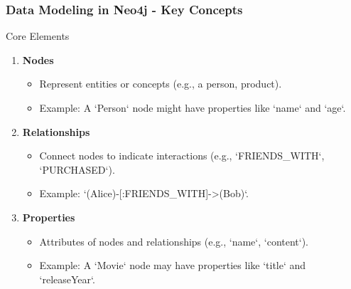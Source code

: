 \documentclass[aspectratio=169]{beamer}
\begin{document}
\begin{frame}[fragile]
    \frametitle{Data Modeling in Neo4j - Key Concepts}
    \begin{block}{Core Elements}
        \begin{enumerate}
            \item \textbf{Nodes}
            \begin{itemize}
                \item Represent entities or concepts (e.g., a person, product).
                \item Example: A `Person` node might have properties like `name` and `age`.
            \end{itemize}
        
            \item \textbf{Relationships}
            \begin{itemize}
                \item Connect nodes to indicate interactions (e.g., `FRIENDS_WITH`, `PURCHASED`).
                \item Example: `(Alice)-[:FRIENDS_WITH]->(Bob)`.
            \end{itemize}
        
            \item \textbf{Properties}
            \begin{itemize}
                \item Attributes of nodes and relationships (e.g., `name`, `content`).
                \item Example: A `Movie` node may have properties like `title` and `releaseYear`.
            \end{itemize}
        \end{enumerate}
    \end{block}
\end{frame}
\end{document}
